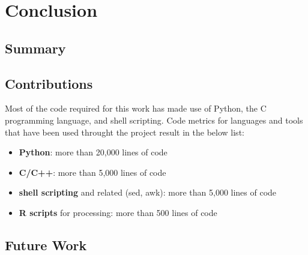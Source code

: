 
\chapter{Conclusion}
\label{chapter:conclusion}


\section{Summary}
\label{sec:conclusion:summary}


\section{Contributions}
\label{sec:conclusion:summary}


Most of the code required for this work has made use of Python, the C
programming language, and shell scripting. Code metrics for languages and
tools that have been used throught the project result in the below list:

\begin{itemize}
  \item \textbf{Python}: more than 20,000 lines of code
  \item \textbf{C/C++}: more than 5,000 lines of code
  \item \textbf{shell scripting} and related (sed, awk): more than 5,000 lines
  of code
  \item \textbf{R scripts} for processing: more than 500 lines of code
\end{itemize}

\section{Future Work}
\label{sec:conclusion:summary}

